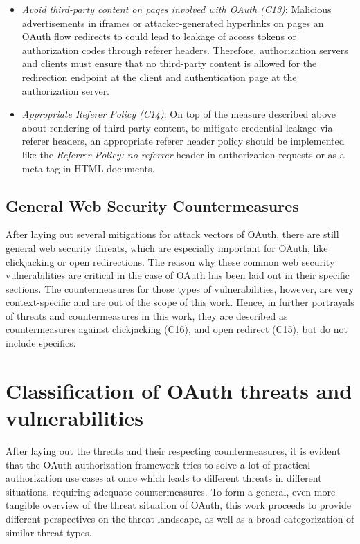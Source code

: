 \begin{itemize}
\item \emph{Avoid third-party content on pages involved with OAuth (C13)}:
\label{item:avoid3rd}
Malicious advertisements in iframes or attacker-generated hyperlinks on pages an OAuth flow redirects to could lead to leakage of access tokens or authorization codes through referer headers. Therefore, authorization servers and clients must ensure that no third-party content is allowed for the redirection endpoint at the client and authentication page at the authorization server.

\item \emph{Appropriate Referer Policy (C14)}: On top of the measure described above about rendering of third-party content, to mitigate credential leakage via referer headers, an appropriate referer header policy should be implemented like the \emph{Referrer-Policy: no-referrer} header in authorization requests or as a meta tag in HTML documents.

\end{itemize}

\subsection{General Web Security Countermeasures}
\label{counter:C15_16}
After laying out several mitigations for attack vectors of OAuth, there are still general web security threats, which are especially important for OAuth, like clickjacking or open redirections. The reason why these common web security vulnerabilities are critical in the case of OAuth has been laid out in their specific sections. The countermeasures for those types of vulnerabilities, however, are very context-specific and are out of the scope of this work. Hence, in further portrayals of threats and countermeasures in this work, they are described as countermeasures against clickjacking (C16), and open redirect (C15), but do not include specifics.

\section{Classification of OAuth threats and vulnerabilities}
\label{sec:oauth_classification}
After laying out the threats and their respecting countermeasures, it is evident that the OAuth authorization framework tries to solve a lot of practical authorization use cases at once which leads to different threats in different situations, requiring adequate countermeasures. To form a general, even more tangible overview of the threat situation of OAuth, this work proceeds to provide different perspectives on the threat landscape, as well as a broad categorization of similar threat types.

